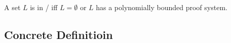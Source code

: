 \documentclass{article}
\begin{document}
\begin{Theorem}
  \begin{theorem}
    A set $L$ is in \np/ iff $L = \emptyset$ or $L$ has a polynomially bounded proof system.
  \end{theorem}
\end{Theorem}

\subsection{Concrete Definitioin}


\ifx\allfiles\undefined
  
\end{document}
